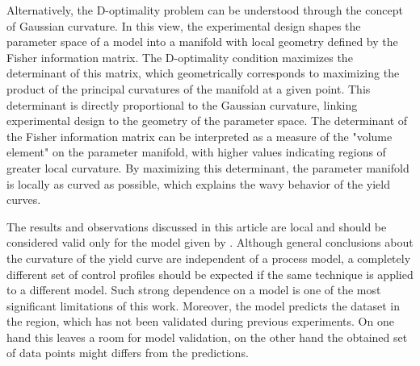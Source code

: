 \documentclass[../Article_Sensitivity_Analsysis.tex]{subfiles}
\begin{document}
	Alternatively, the D-optimality problem can be understood through the concept of Gaussian curvature. In this view, the experimental design shapes the parameter space of a model into a manifold with local geometry defined by the Fisher information matrix. The D-optimality condition maximizes the determinant of this matrix, which geometrically corresponds to maximizing the product of the principal curvatures of the manifold at a given point. This determinant is directly proportional to the Gaussian curvature, linking experimental design to the geometry of the parameter space. The determinant of the Fisher information matrix can be interpreted as a measure of the "volume element" on the parameter manifold, with higher values indicating regions of greater local curvature. By maximizing this determinant, the parameter manifold is locally as curved as possible, which explains the wavy behavior of the yield curves.
	
	The results and observations discussed in this article are local and should be considered valid only for the model given by \citet{Sliczniuk2024}. Although general conclusions about the curvature of the yield curve are independent of a process model, a completely different set of control profiles should be expected if the same technique is applied to a different model. Such strong dependence on a model is one of the most significant limitations of this work. Moreover, the model predicts the dataset in the region, which has not been validated during previous experiments. On one hand this leaves a room for model validation, on the other hand the obtained set of data points might differs from the predictions.
	
\end{document}
